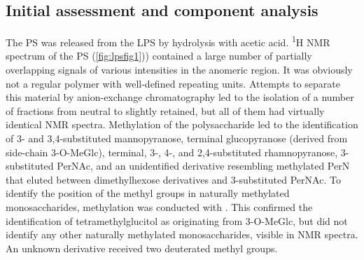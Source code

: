        \subsection{Initial assessment and component analysis} %
        \label{sub:initial_assessment_and_component_analysis}

        The \ac{PS} was released from the \ac{LPS} by hydrolysis with acetic acid. \textsuperscript{1}H
        \ac{NMR} spectrum of the \ac{PS} (\cref{fig:lpsfig1})) contained a large number of partially
        overlapping signals of various intensities in the anomeric region. It was obviously not a regular
        polymer with well-defined repeating units. Attempts to separate this material by anion-exchange
        chromatography led to the isolation of a number of fractions from neutral to slightly retained,
        but all of them had virtually identical \ac{NMR} spectra. Methylation of the polysaccharide led to
        the identification of 3- and 3,4-substituted mannopyranose, terminal glucopyranose (derived from
        side-chain 3-O-MeGlc), terminal, 3-, 4-, and 2,4-substituted rhamnopyranose, 3-substituted PerNAc,
        and an unidentified derivative resembling methylated PerN that eluted between dimethylhexose
        derivatives and 3-substituted PerNAc. To identify the position of the methyl groups in naturally
        methylated monosaccharides, methylation was conducted with . This confirmed the
        identification of tetramethylglucitol as originating from 3-O-MeGlc, but did not identify any
        other naturally methylated monosaccharides, visible in \ac{NMR} spectra. An unknown derivative
        received two deuterated methyl groups.

